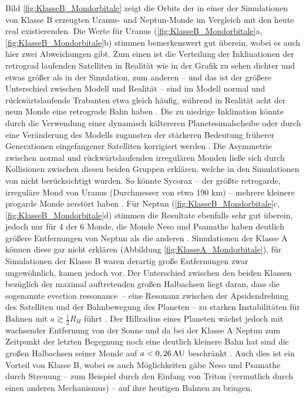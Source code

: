 \documentclass[12pt,a4paper,twoside,open=right,bibliography=totoc]{scrbook}
\renewcommand{\cite}{ \citep}
\begin{document}
Bild \ref{fig:KlasseB_Mondorbitale} zeigt die Orbits der in einer der Simulationen von Klasse B erzeugten Uranus- und Neptun-Monde im Vergleich mit den heute real existierenden.
Die Werte für Uranus (\ref{fig:KlasseB_Mondorbitale}a, \ref{fig:KlasseB_Mondorbitale}b) stimmen bemerkenswert gut überein, wobei es auch hier zwei Abweichungen gibt.
Zum einen ist die Verteilung der Inklinationen der retrograd laufenden Satelliten in Realität wie in der Grafik zu sehen dichter und etwas größer als in der Simulation, 
zum anderen – und das ist der größere Unterschied zwischen Modell und Realität – sind im Modell normal und rückwärtslaufende Trabanten etwa gleich häufig, während in Realität acht der neun Monde eine retrograde Bahn haben\cite{Nesvorny2007}.
Die zu niedrige Inklination könnte durch die Verwendung einer dynamisch kältereren Planetesimalscheibe oder durch eine Veränderung des Modells zugunsten der stärkeren Bedeutung früherer Generationen eingefangener Satelliten korrigiert werden\cite{Nesvorny2007}.
Die Asymmetrie zwischen normal und rückwärtslaufenden irregulären Monden ließe sich durch Kollisionen zwischen diesen beiden Gruppen erklären, welche in den Simulationen von \cite{Nesvorny2007} nicht berücksichtigt wurden. So könnte Sycorax – der größte retrogarde, irreguläre Mond von Uranus (Durchmesser von etwa 190 km) – mehrere kleinere progarde Monde zerstört haben\cite{Nesvorny2007}.
Für Neptun (\ref{fig:KlasseB_Mondorbitale}c, \ref{fig:KlasseB_Mondorbitale}d) stimmen die Resultate ebenfalls sehr gut überein, jedoch nur für 4 der 6 Monde, die Monde Neso und Psamathe haben deutlich größere Entfernungen von Neptun als die anderen\cite{Nesvorny2007}.
Simulationen der Klasse A können diese gar nicht erklären (Abbildung \ref{fig:KlasseA_Mondorbitale}), für Simulationen der Klasse B waren derartig große Entfernungen zwar ungewöhnlich, kamen jedoch vor.
Der Unterschied zwischen den beiden Klassen bezüglich der maximal auftretenden großen Halbachsen liegt daran, dass die sogenannte \glqq evection ressonance\grqq\ -- eine Resonanz zwischen der Apsidendrehung des Satelliten und der Bahnbewegung des Planeten -- zu starken Instabilitäten für Bahnen mit $a \gtrsim \frac{1}{2} R_H$ führt\cite{Nesvorny2003,Nesvorny2007}.
Der Hillradius eines Planeten wächst jedoch mit wachsender Entfernung von der Sonne und da bei der Klasse A Neptun zum Zeitpunkt der letzten Begegnung noch eine deutlich kleinere Bahn hat sind die großen Halbachsen seiner Monde auf $a < \unit[0,26]{AU}$ beschränkt\cite{Nesvorny2007}.
Auch dies ist ein Vorteil von Klasse B, wobei es auch Möglichkeiten gäbe Neso und Psamathe durch Streuung – zum Beispiel durch den Einfang von Triton (vermutlich durch einen anderen Mechanismus) – auf ihre heutigen Bahnen zu bringen. %
\end{document}
